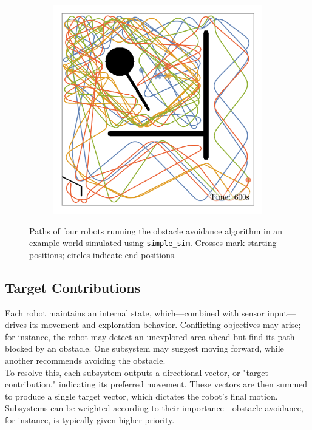 \begin{figure}[H]
\begin{subfigure}[b]{\w}
    \end{subfigure}
    \begin{subfigure}[b]{\w}
        \centering
        \includegraphics[width=\textwidth]{./figures/plots/paths/avoid-obstacles-paths-(after-600s).png}
    \end{subfigure}
    \caption{Paths of four robots running the obstacle avoidance algorithm in an example world simulated using \texttt{simple\_sim}. Crosses mark starting positions; circles indicate end positions.}
    \label{fig:roomba-paths}
\end{figure}

\subsection{Target Contributions}
Each robot maintains an internal state, which—combined with sensor input—drives its movement and exploration behavior. Conflicting objectives may arise; for instance, the robot may detect an unexplored area ahead but find its path blocked by an obstacle. One subsystem may suggest moving forward, while another recommends avoiding the obstacle. \\

To resolve this, each subsystem outputs a directional vector, or "target contribution," indicating its preferred movement. These vectors are then summed to produce a single target vector, which dictates the robot’s final motion. Subsystems can be weighted according to their importance—obstacle avoidance, for instance, is typically given higher priority.


